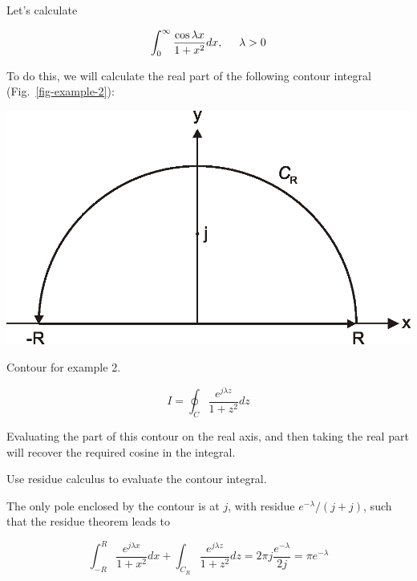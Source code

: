 Let's calculate

\begin{equation}
\int_0^{\infty}\frac{\cos \lambda x}{1 + x^2} dx, \hspace{0.5cm} \lambda > 0
\end{equation}

\noindent{}To do this, we will calculate the real part of the following contour integral (Fig.~\ref{fig-example-2}):

\begin{marginfigure}
\centering
\includegraphics{complex/figures/int_ex_2}
\caption{Contour for example 2.}
\label{fig-example-2}
\end{marginfigure}

\begin{equation}
I = \oint_{{C}} \frac{e^{j \lambda z}}{1 + z^2} dz
\end{equation}

Evaluating the part of this contour on the real axis, and then taking the real part will recover the required cosine in the integral.

\begin{cue}
  Use residue calculus to evaluate the contour integral.
\end{cue}

The only pole enclosed by the contour is at $j$, with residue $e^{-\lambda}/(j+j)$, such that the residue theorem leads to

\begin{equation}
\int_{-R}^{R} \frac{e^{j \lambda x}}{1 + x^2} dx + \int_{{C_R}}
\frac{e^{j \lambda z}}{1 + z^2} dz = 2 \pi j \frac{e^{-\lambda}}{2 j} = \pi
e^{-\lambda}
\end{equation}

